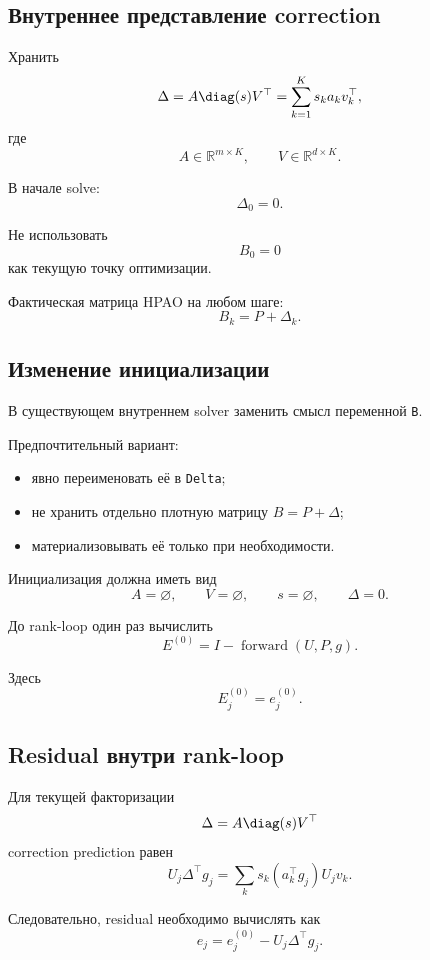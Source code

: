 \subsection{Внутреннее представление correction}

Хранить
\[
    \Delta
    =
    A\diag(s)V^\top
    =
    \sum_{k=1}^{K}
    s_k a_kv_k^\top,
\]
где
\[
    A\in\mathbb R^{m\times K},
    \qquad
    V\in\mathbb R^{d\times K}.
\]

В начале solve:
\[
\boxed{
    \Delta_0=0.
}
\]

Не использовать
\[
    B_0=0
\]
как текущую точку оптимизации.

Фактическая матрица HPAO на любом шаге:
\[
\boxed{
    B_k=P+\Delta_k.
}
\]

\subsection{Изменение инициализации}

В существующем внутреннем solver заменить смысл переменной
\texttt{B}.

Предпочтительный вариант:
\begin{itemize}
    \item явно переименовать её в \texttt{Delta};
    \item не хранить отдельно плотную матрицу $B=P+\Delta$;
    \item материализовывать её только при необходимости.
\end{itemize}

Инициализация должна иметь вид
\[
    A=\varnothing,
    \qquad
    V=\varnothing,
    \qquad
    s=\varnothing,
    \qquad
    \Delta=0.
\]

До rank-loop один раз вычислить
\[
\boxed{
    E^{(0)}
    =
    I-\operatorname{forward}(U,P,g).
}
\]

Здесь
\[
    E^{(0)}_j=e_j^{(0)}.
\]

\subsection{Residual внутри rank-loop}

Для текущей факторизации
\[
    \Delta
    =
    A\diag(s)V^\top
\]
correction prediction равен
\[
    U_j\Delta^\top g_j
    =
    \sum_k
    s_k
    (a_k^\top g_j)
    U_jv_k.
\]

Следовательно, residual необходимо вычислять как
\[
\boxed{
    e_j
    =
    e_j^{(0)}
    -
    U_j\Delta^\top g_j.
}
\]

